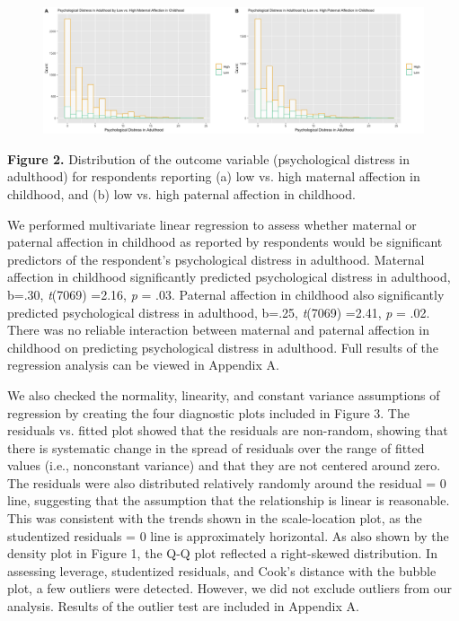 \documentclass[12pt,letterpaper]{article}
\begin{document}
\begin{figure}[H]
	\centering
	\includegraphics[scale=0.32]{histogram1.png}
\end{figure}	

\begin{center}
	\singlespacing
	\textbf{Figure 2.} Distribution of the outcome variable (psychological distress in adulthood) for respondents reporting (a) low vs. high maternal affection in childhood, and (b) low vs. high paternal affection in childhood. 
\end{center}

We performed multivariate linear regression to assess whether maternal or paternal affection in childhood as reported by respondents would be significant predictors of the respondent's psychological distress in adulthood. Maternal affection in childhood significantly predicted psychological distress in adulthood, b=.30, \textit{t}(7069) =2.16, \textit{p} = .03. Paternal affection in childhood also significantly predicted psychological distress in adulthood, b=.25, \textit{t}(7069) =2.41, \textit{p} = .02.  There was no reliable interaction between maternal and paternal affection in childhood on predicting psychological distress in adulthood. Full results of the regression analysis can be viewed in Appendix A. 

We also checked the normality, linearity, and constant variance assumptions of regression by creating the four diagnostic plots included in Figure 3. The residuals vs. fitted plot showed that the residuals are non-random, showing that there is systematic change in the spread of residuals over the range of fitted values (i.e., nonconstant variance) and that they are not centered around zero. The residuals were also distributed relatively randomly around the residual = 0 line, suggesting that the assumption that the relationship is linear is reasonable. This was consistent with the trends shown in the scale-location plot, as the studentized residuals = 0 line is approximately horizontal. As also shown by the density plot in Figure 1, the Q-Q plot reflected a right-skewed distribution. In assessing leverage, studentized residuals, and Cook's distance with the bubble plot, a few outliers were detected. However, we did not exclude outliers from our analysis. Results of the outlier test are included in Appendix A. 
\end{document}
